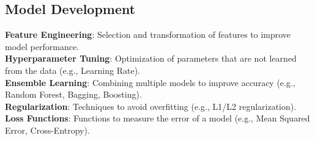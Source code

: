 \documentclass[english]{latex4ei/latex4ei_sheet}
\begin{document}
\begin{sectionbox}
\subsection{Model Development}
\textbf{Feature Engineering}: Selection and transformation of features to improve model performance.\\
\textbf{Hyperparameter Tuning}: Optimization of parameters that are not learned from the data (e.g., Learning Rate).\\
\textbf{Ensemble Learning}: Combining multiple models to improve accuracy (e.g., Random Forest, Bagging, Boosting).\\
\textbf{Regularization}: Techniques to avoid overfitting (e.g., L1/L2 regularization).\\
\textbf{Loss Functions}: Functions to measure the error of a model (e.g., Mean Squared Error, Cross-Entropy).
\end{sectionbox}
\end{document}
